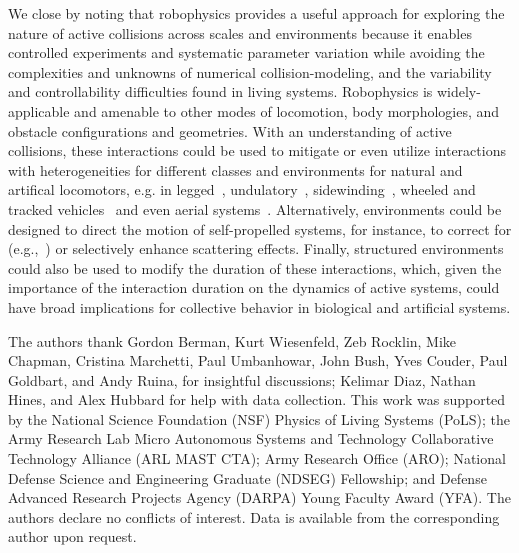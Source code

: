 \documentclass[aps,pre,twocolumn,superscriptaddress]{revtex4-1}
\begin{document}
We close by noting that robophysics provides a useful approach for exploring the nature of active collisions across scales and environments because it enables controlled experiments and systematic parameter variation while avoiding the complexities and unknowns of numerical collision-modeling, and the variability and controllability difficulties found in living systems. Robophysics is widely-applicable and amenable to other modes of locomotion, body morphologies, and obstacle configurations and geometries. With an understanding of active collisions, these interactions could be used to mitigate or even utilize interactions with heterogeneities for different classes and environments for natural and artifical locomotors, e.g. in legged~\cite{li2013, Li:2015jn}, undulatory~\cite{jayne1986kinematics,majmudar2012experiments}, sidewinding~\cite{marvi2014sidewinding}, wheeled and tracked vehicles~\cite{iagnemma2003experimental,wong2009terramechanics} and even aerial systems~\cite{floreano2010flying,turpin2012trajectory}. Alternatively, environments could be designed to direct the motion of self-propelled systems, for instance, to correct for (e.g.,~\cite{Kantsler:2013ge}) or selectively enhance scattering effects. Finally, structured environments could also be used to modify the duration of these interactions, which, given the importance of the interaction duration on the dynamics of active systems, could have broad implications for collective behavior in biological and artificial systems. 


\begin{acknowledgments}
The authors thank Gordon Berman, Kurt Wiesenfeld, Zeb Rocklin, Mike Chapman, Cristina Marchetti, Paul Umbanhowar, John Bush, Yves Couder, Paul Goldbart, and Andy Ruina, for insightful discussions; Kelimar Diaz, Nathan Hines, and Alex Hubbard  for help with data collection. This work was supported by the National Science Foundation (NSF) Physics of Living Systems (PoLS); the Army Research Lab Micro Autonomous Systems and Technology Collaborative Technology Alliance (ARL MAST CTA); Army Research Office (ARO);  National Defense Science and Engineering Graduate (NDSEG) Fellowship; and Defense Advanced Research Projects Agency (DARPA) Young Faculty Award (YFA). The authors declare no conflicts of interest. Data is available from the corresponding author upon request.
\end{acknowledgments}



%
\end{document}
